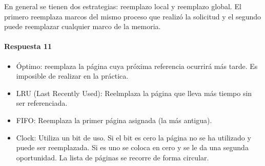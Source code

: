 En general se tienen dos estrategias: reemplazo local y reemplazo global. El primero reemplaza marcos del mismo proceso que realizó la solicitud y el segundo puede reemplazar cualquier marco de la memoria.

\paragraph{Respuesta 11}
\begin{itemize}
  \item Óptimo: reemplaza la página cuya próxima referencia ocurrirá más tarde. Es imposible de realizar en la práctica.
  \item LRU (Last Recently Used): Reelmplaza la página que lleva más tiempo sin ser referenciada.
  \item FIFO: Reemplaza la primer página asignada (la más antigua).
  \item Clock: Utiliza un bit de uso. Si el bit es cero la página no se ha utilizado y puede ser reemplazada. Si es uno se coloca en cero y se le da una segunda oportunidad. La lista de páginas se recorre de forma circular.
\end{itemize}
